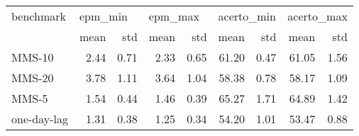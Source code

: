 \begin{tabular}{lrrrrrrrr}
\toprule
  benchmark & \multicolumn{2}{l}{epm\_min} & \multicolumn{2}{l}{epm\_max} & \multicolumn{2}{l}{acerto\_min} & \multicolumn{2}{l}{acerto\_max} \\
            &    mean &  std &    mean &  std &       mean &  std &       mean &  std \\
\midrule
     MMS-10 &    2.44 & 0.71 &    2.33 & 0.65 &      61.20 & 0.47 &      61.05 & 1.56 \\
     MMS-20 &    3.78 & 1.11 &    3.64 & 1.04 &      58.38 & 0.78 &      58.17 & 1.09 \\
      MMS-5 &    1.54 & 0.44 &    1.46 & 0.39 &      65.27 & 1.71 &      64.89 & 1.42 \\
one-day-lag &    1.31 & 0.38 &    1.25 & 0.34 &      54.20 & 1.01 &      53.47 & 0.88 \\
\bottomrule
\end{tabular}
